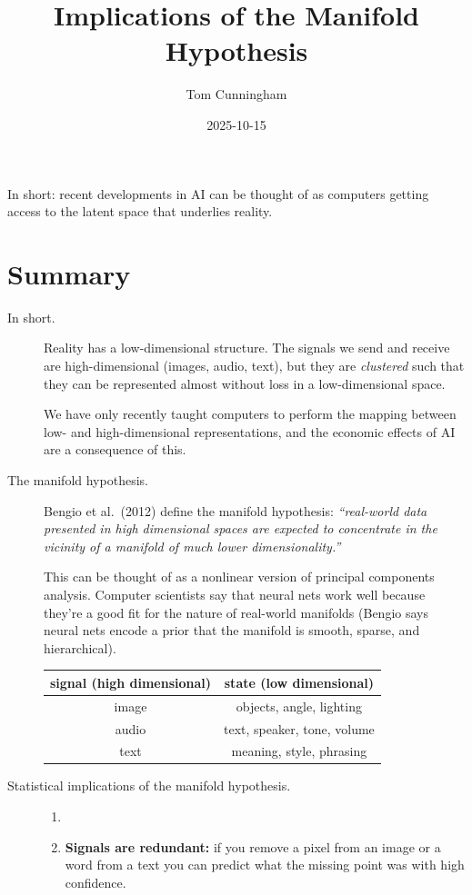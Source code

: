 \documentclass[
  10pt,
  letterpaper,
  DIV=11,
  numbers=noendperiod,
  oneside]{scrartcl}
\title{Implications of the Manifold Hypothesis}
\author{Tom Cunningham}
\date{2025-10-15}
\providecommand{\tightlist}{%
  \setlength{\itemsep}{0pt}\setlength{\parskip}{0pt}}\usepackage{longtable,booktabs,array}
\begin{document}
\maketitle


In short: recent developments in AI can be thought of as computers
getting access to the latent space that underlies reality.

\section{Summary}\label{summary}

\begin{description}
\item[In short.]
Reality has a low-dimensional structure. The signals we send and receive
are high-dimensional (images, audio, text), but they are
\emph{clustered} such that they can be represented almost without loss
in a low-dimensional space.

We have only recently taught computers to perform the mapping between
low- and high-dimensional representations, and the economic effects of
AI are a consequence of this.
\item[The manifold hypothesis.]
Bengio et al.~(2012) define the manifold hypothesis: \emph{``real-world
data presented in high dimensional spaces are expected to concentrate in
the vicinity of a manifold of much lower dimensionality.''}

This can be thought of as a nonlinear version of principal components
analysis. Computer scientists say that neural nets work well because
they're a good fit for the nature of real-world manifolds (Bengio says
neural nets encode a prior that the manifold is smooth, sparse, and
hierarchical).

\begin{longtable}[]{@{}cc@{}}
\toprule\noalign{}
signal (high dimensional) & state (low dimensional) \\
\midrule\noalign{}
\endhead
\bottomrule\noalign{}
\endlastfoot
image & objects, angle, lighting \\
audio & text, speaker, tone, volume \\
text & meaning, style, phrasing \\
\end{longtable}
\item[Statistical implications of the manifold hypothesis.]
\begin{enumerate}
\def\labelenumi{\arabic{enumi}.}
\tightlist
\item[]
\item
  \textbf{Signals are redundant:} if you remove a pixel from an image or
  a word from a text you can predict what the missing point was with
  high confidence.
\end{enumerate}


\end{description}
\end{document}
